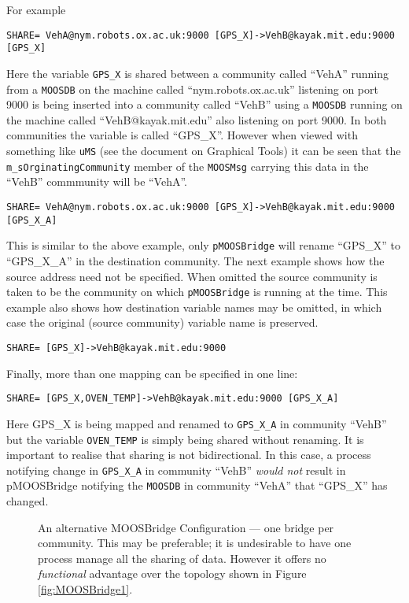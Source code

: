 \documentclass[a4paper,10pt]{article}
\newcommand{\Code}[1]{\texttt{#1} }
\newcommand{\code}[1]{\Code{#1} }
\newcommand{\DB}   {\code{{MOOSDB}}}
\begin{document}
For example\\
\begin{verbatim}
SHARE= VehA@nym.robots.ox.ac.uk:9000 [GPS_X]->VehB@kayak.mit.edu:9000 [GPS_X]
\end{verbatim}
Here the variable \code{GPS\_X} is shared between a community called ``VehA'' running from a \DB on the machine called
``nym.robots.ox.ac.uk'' listening on port 9000 is being inserted into a community called ``VehB'' using a \DB running on the machine called
``VehB@kayak.mit.edu'' also listening on port 9000. In both communities the variable is called ``GPS\_X''. However when viewed with
something like \code{uMS} (see the document on Graphical Tools) it can be seen that the \code{m\_sOrginatingCommunity} member of the \code{MOOSMsg}
carrying this data in the ``VehB'' commmunity will be ``VehA''.

\begin{verbatim}
SHARE= VehA@nym.robots.ox.ac.uk:9000 [GPS_X]->VehB@kayak.mit.edu:9000 [GPS_X_A]
\end{verbatim}
This is similar to the above example, only \code{pMOOSBridge} will rename ``GPS\_X'' to ``GPS\_X\_A'' in the
destination community. The next example shows how the source address need not be specified. When omitted the source community is
taken to be the community on which \code{pMOOSBridge} is running at the time. This example also shows how destination variable names may be omitted, in
which case the original (source community) variable name is preserved.
\begin{verbatim}
SHARE= [GPS_X]->VehB@kayak.mit.edu:9000
\end{verbatim}
Finally, more than one mapping can be specified in one line:
\begin{verbatim}
SHARE= [GPS_X,OVEN_TEMP]->VehB@kayak.mit.edu:9000 [GPS_X_A]
\end{verbatim}
Here GPS\_X is being mapped and renamed to \code{GPS\_X\_A} in community ``VehB'' but the variable \code{OVEN\_TEMP} is simply being shared without renaming.
It is important to realise that sharing is not bidirectional. In this case, a process notifying change in \code{GPS\_X\_A} in community ``VehB'' \emph{would not}
result in pMOOSBridge notifying the \DB in community ``VehA'' that ``GPS\_X'' has changed.


\begin{figure}[ht]
\centering {} \caption{An alternative MOOSBridge Configuration
--- one bridge per community. This may be preferable; it is undesirable to have one process manage all
the sharing of data. However it offers no \emph{functional} advantage over the topology shown in Figure
\ref{fig:MOOSBridge1}.}\label{fig:MOOSBridge2}
\end{figure}
\end{document}
